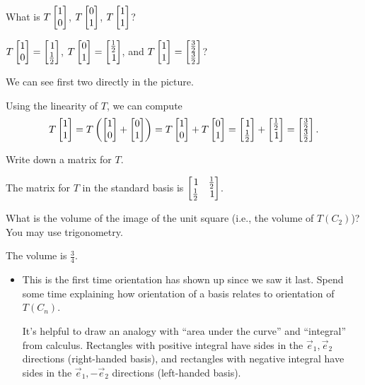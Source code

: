 	\begin{parts}
		\item What is $T\mat{1\\0}$, $T\mat{0\\1}$, $T\mat{1\\1}$?
			\begin{solution}
				$T\mat{1\\0}=\mat{1\\\frac{1}{2}}$,
				$T\mat{0\\1}=\mat{\frac{1}{2}\\1}$, and
				$T\mat{1\\1}=\mat{\frac{3}{2}\\\frac{3}{2}}$?

				We can see first two directly in the picture.

				Using the linearity of $T$, we can compute
				\[
					T\mat{1\\1}
					=T\left(\mat{1\\0}+\mat{0\\1}\right)
					=T\mat{1\\0}+T\mat{0\\1}
					=\mat{1\\\frac{1}{2}}+\mat{\frac{1}{2}\\1}
					=\mat{\frac{3}{2}\\\frac{3}{2}}.
				\]

			\end{solution}
		\item Write down a matrix for $T$.
			\begin{solution}
				The matrix for $T$ in the standard basis is
				$\mat{1&\frac{1}{2}\\\frac{1}{2}&1}$.
			\end{solution}
		\item What is the volume of the image of the unit square
			(i.e., the volume of $T(C_2)$)? You may use trigonometry.
			\begin{solution}
				The volume is $\frac{3}{4}$.
			\end{solution}
	\end{parts}

	\bookonlynewpage
	\begin{annotation}
		\begin{notes}
			\begin{itemize}
				\item This is the first time orientation has shown up since we saw it last. Spend some
					time explaining how orientation of a basis relates to orientation of $T(C_n)$.

					It's helpful to draw an analogy with ``area under the curve'' and ``integral'' 
					from calculus. Rectangles with positive integral have sides in the $\vec e_1,\vec e_2$
					directions (right-handed basis), and rectangles with negative integral
					have sides in the $\vec e_1,-\vec e_2$ directions (left-handed basis).
			\end{itemize}
		\end{notes}
	\end{annotation}

